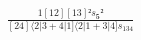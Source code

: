 \documentclass[varwidth, border=5pt]{standalone}
\begin{document}
\begin{my}
$\begin{gathered}
\scriptscriptstyle\frac{1[12][13]²s_{𝟓}²}{[24]⟨2|3+4|1]⟨2|1+3|4]s_{134}}
\end{gathered}$
\end{my}
\end{document}

